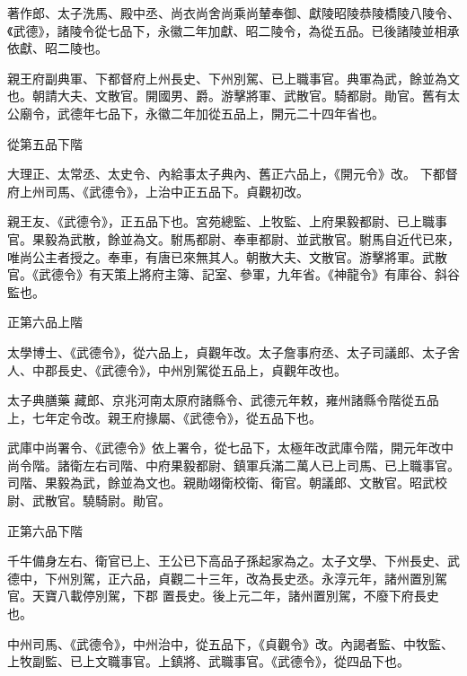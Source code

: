 \begin{pinyinscope}
 著作郎、太子洗馬、殿中丞、尚衣尚舍尚乘尚輦奉御、獻陵昭陵恭陵橋陵八陵令、《武德》，諸陵令從七品下，永徽二年加獻、昭二陵令，為從五品。已後諸陵並相承依獻、昭二陵也。



 親王府副典軍、下都督府上州長史、下州別駕、已上職事官。典軍為武，餘並為文也。朝請大夫、文散官。開國男、爵。游擊將軍、武散官。騎都尉。勛官。舊有太公廟令，武德年七品下，永徽二年加從五品上，開元二十四年省也。



 從第五品下階



 大理正、太常丞、太史令、內給事太子典內、舊正六品上，《開元令》改。
 下都督府上州司馬、《武德令》，上治中正五品下。貞觀初改。



 親王友、《武德令》，正五品下也。宮苑總監、上牧監、上府果毅都尉、已上職事官。果毅為武散，餘並為文。駙馬都尉、奉車都尉、並武散官。駙馬自近代已來，唯尚公主者授之。奉車，有唐已來無其人。朝散大夫、文散官。游擊將軍。武散官。《武德令》有天策上將府主簿、記室、參軍，九年省。《神龍令》有庫谷、斜谷監也。



 正第六品上階



 太學博士、《武德令》，從六品上，貞觀年改。太子詹事府丞、太子司議郎、太子舍人、中郡長史、《武德令》，中州別駕從五品上，貞觀年改也。



 太子典膳藥
 藏郎、京兆河南太原府諸縣令、武德元年敕，雍州諸縣令階從五品上，七年定令改。親王府掾屬、《武德令》，從五品下也。



 武庫中尚署令、《武德令》依上署令，從七品下，太極年改武庫令階，開元年改中尚令階。諸衛左右司階、中府果毅都尉、鎮軍兵滿二萬人已上司馬、已上職事官。司階、果毅為武，餘並為文也。親勛翊衛校衛、衛官。朝議郎、文散官。昭武校尉、武散官。驍騎尉。勛官。



 正第六品下階



 千牛備身左右、衛官已上、王公已下高品子孫起家為之。太子文學、下州長史、武德中，下州別駕，正六品，貞觀二十三年，改為長史丞。永淳元年，諸州置別駕官。天寶八載停別駕，下郡
 置長史。後上元二年，諸州置別駕，不廢下府長史也。



 中州司馬、《武德令》，中州治中，從五品下，《貞觀令》改。內謁者監、中牧監、上牧副監、已上文職事官。上鎮將、武職事官。《武德令》，從四品下也。




\end{pinyinscope}
